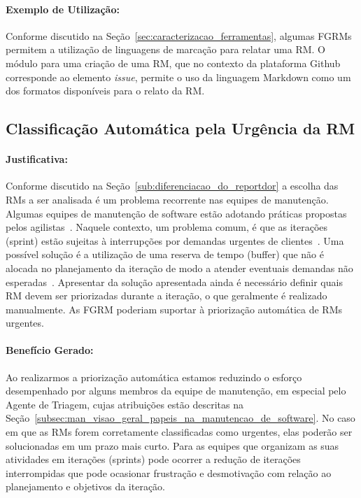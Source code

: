\paragraph{Exemplo de Utilização:}
\label{par:exemplo_de_utilização_s06}

Conforme discutido na Seção~\ref{sec:caracterizacao_ferramentas}, algumas FGRMs
permitem a utilização de linguagens de marcação para relatar uma RM\@. O módulo
para uma criação de uma RM, que no contexto da plataforma Github corresponde ao
elemento \textit{issue}, permite o uso da linguagem Markdown como um dos
formatos disponíveis para o relato da RM\@.

\subsection{Classificação Automática pela Urgência da RM}
\label{sub:priorizacao_automatica_rms}


\paragraph{Justificativa:}
\label{par:justificativa_s07}

Conforme discutido na Seção~\ref{sub:diferenciacao_do_reportdor} a escolha das
RMs a ser analisada é um problema recorrente nas equipes de manutenção. Algumas
equipes de manutenção de software estão adotando práticas propostas pelos
agilistas~\cite{svensson2005introducing}. Naquele contexto, um problema
comum, é que as iterações (sprint) estão sujeitas à interrupções por demandas
urgentes de clientes~\cite{bennett2000software}. Uma possível solução é a
utilização de uma reserva de tempo (buffer) que não é alocada no planejamento da
iteração de modo a atender eventuais demandas não
esperadas~\cite{schwaber2002agile}. Apresentar da solução apresentada ainda é
necessário definir quais RM devem ser priorizadas durante a iteração, o que
geralmente é realizado manualmente. As FGRM poderiam suportar à priorização
automática de RMs urgentes.

\paragraph{Benefício Gerado:}
\label{par:papéis_afetados_s07}

Ao realizarmos a priorização automática estamos reduzindo o esforço desempenhado
por alguns membros da equipe de manutenção, em especial pelo Agente de Triagem,
cujas atribuições estão descritas na
Seção~\ref{subsec:man_visao_geral_papeis_na_manutencao_de_software}. No caso em
que as RMs forem corretamente classificadas como urgentes, elas poderão ser
solucionadas em um prazo mais curto. Para as equipes que organizam as suas
atividades em iterações (sprints) pode ocorrer a redução de iterações
interrompidas que pode ocasionar frustração e desmotivação com relação ao
planejamento e objetivos da iteração.

